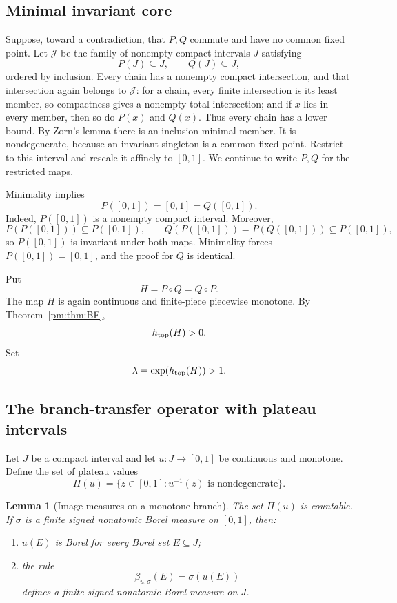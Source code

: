 \documentclass[11pt]{article}
\newtheorem{lemma}[theorem]{Lemma}
\theoremstyle{definition}
\theoremstyle{remark}
\newcommand{\I}{[0,1]}
\begin{document}
\subsection{Minimal invariant core}

Suppose, toward a contradiction, that $P,Q$ commute and have no common fixed
point.  Let $\mathscr J$ be the family of nonempty compact intervals $J$
satisfying
\[
 P(J)\subseteq J,\qquad Q(J)\subseteq J,
\]
ordered by inclusion.  Every chain has a nonempty compact intersection, and
that intersection again belongs to $\mathscr J$: for a chain, every finite
intersection is its least member, so compactness gives a nonempty total
intersection; and if $x$ lies in every member, then so do $P(x)$ and $Q(x)$.
Thus every chain has a lower bound.  By Zorn's lemma there is an
inclusion-minimal member.  It is nondegenerate, because an invariant
singleton is a common fixed point.  Restrict to this interval and rescale it
affinely to $\I$.  We continue to write $P,Q$ for the restricted maps.

Minimality implies
\begin{equation}\label{pm:eq:onto}
 P(\I)=\I=Q(\I).
\end{equation}
Indeed, $P(\I)$ is a nonempty compact interval.  Moreover,
\[
 P(P(\I))\subseteq P(\I),\qquad
 Q(P(\I))=P(Q(\I))\subseteq P(\I),
\]
so $P(\I)$ is invariant under both maps.  Minimality forces $P(\I)=\I$,
and the proof for $Q$ is identical.

Put
\[
 H=P\circ Q=Q\circ P.
\]
The map $H$ is again continuous and finite-piece piecewise monotone.  By
Theorem~\ref{pm:thm:BF},
\begin{equation}\label{pm:eq:positive-entropy}
 h_{\rm top}(H)>0.
\end{equation}
Set
\[
 \lambda=\exp(h_{\rm top}(H))>1.
\]

\subsection{The branch-transfer operator with plateau intervals}

Let $J$ be a compact interval and let $u:J\to\I$ be continuous and
monotone.  Define the set of plateau values
\[
 \Pi(u)=\{z\in\I:u^{-1}(z)\text{ is nondegenerate}\}.
\]

\begin{lemma}[Image measures on a monotone branch]
\label{pm:lem:monotone-image-measure}
The set $\Pi(u)$ is countable.  If $\sigma$ is a finite signed nonatomic
Borel measure on $\I$, then:
\begin{enumerate}
\item $u(E)$ is Borel for every Borel set $E\subseteq J$;
\item the rule
\[
 \beta_{u,\sigma}(E)=\sigma(u(E))
\]
defines a finite signed nonatomic Borel measure on $J$.
\end{enumerate}
\end{lemma}
\end{document}
